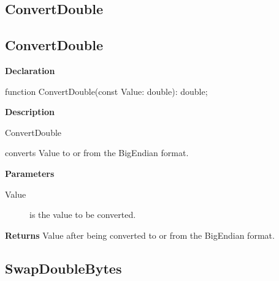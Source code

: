 \documentclass{report}
\newif\ifpdf
\begin{document}
\subsection*{\large{\textbf{ConvertDouble}}\normalsize\hspace{1ex}\hrulefill}
\else
\subsection*{ConvertDouble}
\fi
\label{ok_complicated_record-ConvertDouble}
\begin{list}{}{
\setlength{\itemindent}{0cm}
\setlength{\listparindent}{0cm}
\setlength{\leftmargin}{\evensidemargin}
\addtolength{\leftmargin}{\tmplength}
\settowidth{\labelsep}{X}
\addtolength{\leftmargin}{\labelsep}
\setlength{\labelwidth}{\tmplength}
}
\item[\textbf{Declaration}\hfill]
\ifpdf
\begin{flushleft}
\fi
\begin{ttfamily}
function ConvertDouble(const Value: double): double;\end{ttfamily}

\ifpdf
\end{flushleft}
\fi

\par
\item[\textbf{Description}]
\begin{ttfamily}ConvertDouble\end{ttfamily} converts Value to or from the BigEndian format.\hfill\vspace*{1ex}

  \par
\item[\textbf{Parameters}]
\begin{description}
\item[Value] is the value to be converted.
\end{description}
\item[\textbf{Returns}]Value after being converted to or from the BigEndian format.


\end{list}
\ifpdf
\subsection*{\large{\textbf{SwapDoubleBytes}}\normalsize\hspace{1ex}\hrulefill}
\else
\end{document}
